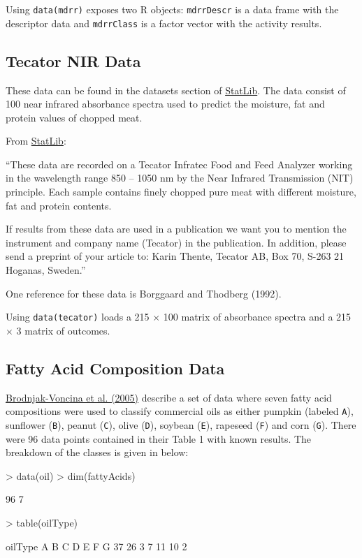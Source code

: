 \documentclass[12pt]{article}
\begin{document}
Using \texttt{data(mdrr)} exposes two R objects: \texttt{mdrrDescr} is a data frame with the descriptor data and \texttt{mdrrClass} is a factor vector with the activity results.

\subsection{Tecator NIR Data}

These data can be found in the datasets section of \href{http://lib.stat.cmu.edu/datasets/tecator} {StatLib}. The data consist of 100 near infrared absorbance spectra used to predict the moisture, fat and protein values of chopped meat.

From \href{http://lib.stat.cmu.edu/datasets/tecator} {StatLib}:

``These data are recorded on a Tecator Infratec Food and Feed Analyzer 
working in the wavelength range 850 -- 1050 nm by the Near Infrared 
Transmission (NIT) principle. Each sample contains finely chopped pure 
meat with different moisture, fat and protein contents.

If results from these data are used in a publication we want you to 
mention the instrument and company name (Tecator) in the publication. 
In addition, please send a preprint of your article to:  Karin Thente, Tecator AB, Box 70, S-263 21 Hoganas, Sweden.''

One reference for these data is Borggaard and Thodberg (1992).

Using \texttt{data(tecator)} loads a 215 $\times$ 100 matrix of absorbance spectra and a 215 $\times$ 3 matrix of outcomes.


\subsection{Fatty Acid Composition Data}

\href{http://dx.doi.org/10.1016/j.chemolab.2004.04.011}{Brodnjak-Voncina et al. (2005)} describe a set of data where seven fatty acid compositions were used to classify commercial oils as either pumpkin (labeled \texttt{A}), sunflower (\texttt{B}), peanut (\texttt{C}), olive (\texttt{D}), soybean (\texttt{E}), rapeseed (\texttt{F}) and corn (\texttt{G}). There were 96 data points contained in their Table 1 with known results. The breakdown of the classes is given in below:

\begin{small}
\begin{Schunk}
\begin{Sinput}
> data(oil)
> dim(fattyAcids)
\end{Sinput}
\begin{Soutput}
[1] 96  7
\end{Soutput}
\begin{Sinput}
> table(oilType)
\end{Sinput}
\begin{Soutput}
oilType
 A  B  C  D  E  F  G 
37 26  3  7 11 10  2 
\end{Soutput}
\end{Schunk}
\end{small}
\end{document}
